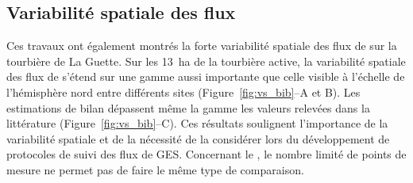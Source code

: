 

%

\subsection*{Variabilité spatiale des flux}

Ces travaux ont également montrés la forte variabilité spatiale des flux de \coo sur la tourbière de La Guette.
Sur les \SI{13}{\hectare} de la tourbière active, la variabilité spatiale des flux de \coo s'étend sur une gamme aussi importante que celle visible à l'échelle de l'hémisphère nord entre différents sites (Figure~\ref{fig:vs_bib}--A et B).
Les estimations de bilan dépassent même la gamme les valeurs relevées dans la littérature (Figure~\ref{fig:vs_bib}--C).
Ces résultats soulignent l'importance de la variabilité spatiale et de la nécessité de la considérer lors du développement de protocoles de suivi des flux de GES.
Concernant le \chh, le nombre limité de points de mesure ne permet pas de faire le même type de comparaison.

